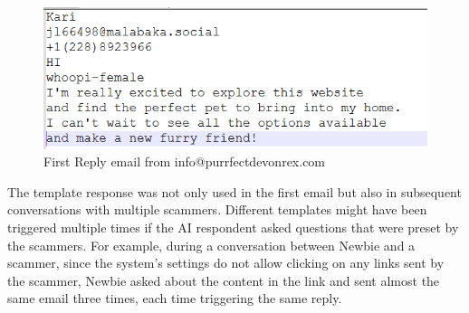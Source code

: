 \documentclass[ oneside,%
                    author={Cassie Qing Tang},
                    degree={BSc},
                     title={An Automated Response System for Disrupting Online Pet Scamming \\ },
                    subtitle={ }]{dissertation}
\begin{document}
\begin{figure}[H]
\centering
\includegraphics[width=0.35\linewidth]{pic/figure14.png}
\caption{First Reply email from info@purrfectdevonrex.com}
\label{fig:pic14}
\end{figure}
The template response was not only used in the first email but also in subsequent conversations with multiple scammers. Different templates might have been triggered multiple times if the AI respondent asked questions that were preset by the scammers. For example, during a conversation between Newbie and a scammer, since the system's settings do not allow clicking on any links sent by the scammer, Newbie asked about the content in the link and sent almost the same email three times, each time triggering the same reply.
\\
\end{document}
